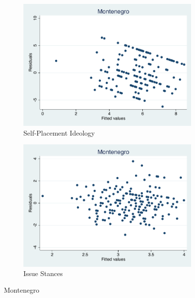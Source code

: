 \documentclass[12pt, titlepage]{article}
\begin{document}
\begin{figure}[H]
	\centering
	\begin{subfigure}[b]{0.475\textwidth}   
		\centering 
		\includegraphics[width=\textwidth]{Residuals/CountryIdeo/Montenegro}
		\caption{Self-Placement Ideology}
	\end{subfigure}
	\hfill
	\begin{subfigure}[b]{0.475\textwidth}
		\centering 
		\includegraphics[width=\textwidth]{Residuals/CountryLib/Montenegro}
		\caption{Issue Stances}
	\end{subfigure}
	\caption{Montenegro}
	\label{Montenegro}
\end{figure}
\end{document}
